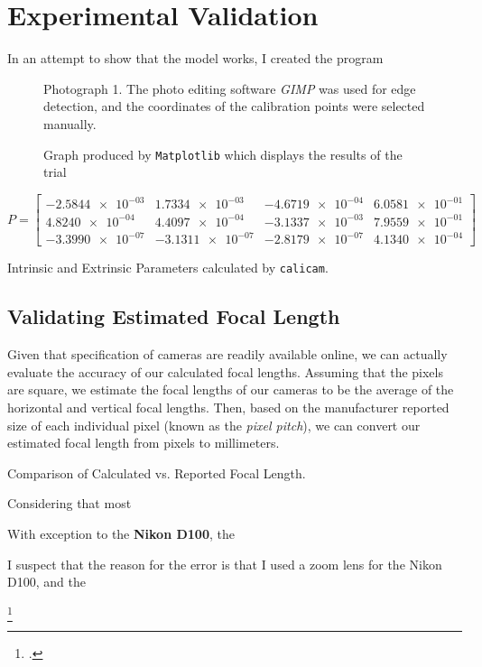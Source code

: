 \section{Experimental Validation}

In an attempt to show that the model works, I created the program

\begin{figure}[H]
    \centering
    \caption{Photograph 1. The photo editing software \emph{GIMP} was used for edge detection, and the coordinates of the calibration points were selected manually. }
\end{figure}



\begin{figure}[H]
    \centering
    \caption{Graph produced by \texttt{Matplotlib} which displays the results of the trial}
\end{figure}

\begin{equation*}
    P =
    \begin{bmatrix}
        \num{-2.5844e-03} & \num{1.7334e-03}  & \num{-4.6719e-04} & \num{6.0581e-01} \\
        \num{4.8240e-04}  & \num{4.4097e-04}  & \num{-3.1337e-03} & \num{7.9559e-01} \\
        \num{-3.3990e-07} & \num{-3.1311e-07} & \num{-2.8179e-07} & \num{4.1340e-04}
    \end{bmatrix}
\end{equation*}

\begin{table}[H]
    \centering
    
    \caption{Intrinsic and Extrinsic Parameters calculated by \texttt{calicam}.}
\end{table}

\subsection{Validating Estimated Focal Length}
Given that specification of cameras are readily available online, we can actually evaluate the accuracy of our calculated focal lengths. Assuming that the pixels are square, we estimate the focal lengths of our cameras to be the average of the horizontal and vertical focal lengths. Then, based on the manufacturer reported size of each individual pixel (known as the \emph{pixel pitch}), we can convert our estimated focal length from pixels to millimeters.

\begin{table}[H]
    \centering
    
    \caption{Comparison of Calculated vs. Reported Focal Length.}
\end{table}

Considering that most 

With exception to the \textbf{Nikon D100}, the 

I suspect that the reason for the error is that I used a zoom lens for the Nikon D100, and the 

\footcite{waynefAnswerAre2017}
